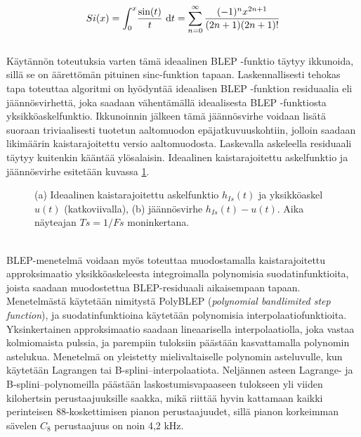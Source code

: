 \documentclass[finnish,12pt,a4paper,pdftex]{article} %
\begin{document}
\vspace{1mm}
\begin{equation}
Si(x) =  \int_{0}^x \! \frac{\text{sin}(t)}{t} \ \mathrm{d}t = \sum_{n=0}^{\infty} \\ 
\frac{(-1)^n x^{2n+1}}{(2n+1)(2n+1)!}
\end{equation} \\
\clearpage \noindent
Käytännön toteutuksia varten tämä ideaalinen BLEP -funktio täytyy ikkunoida, sillä se on äärettömän pituinen sinc-funktion tapaan. Laskennallisesti tehokas tapa toteuttaa algoritmi on hyödyntää ideaalisen BLEP -funktion residuaalia eli jäännösvirhettä, joka saadaan vähentämällä ideaalisesta BLEP -funktiosta yksikköaskelfunktio. Ikkunoinnin jälkeen tämä jäännösvirhe voidaan lisätä suoraan triviaalisesti tuotetun aaltomuodon epäjatkuvuuskohtiin, jolloin saadaan likimäärin kaistarajoitettu versio aaltomuodosta. Laskevalla askeleella residuaali täytyy kuitenkin kääntää ylösalaisin. Ideaalinen kaistarajoitettu askelfunktio ja jäännösvirhe esitetään kuvassa \ref{fig:iblep}. \cite{Valimaki2007, Pekonen2014, Valimaki2012} 
\begin{figure}[h] 
\begin{center} 
\caption{(a) Ideaalinen kaistarajoitettu askelfunktio $h_{Is}(t)$ ja yksikköaskel $u(t)$ (katkoviivalla), (b) jäännösvirhe $h_{Is}(t)-u(t)$. Aika näyteajan $Ts = 1/Fs$ moninkertana.}
\label{fig:iblep}
\end{center}
\end{figure} \\
BLEP-menetelmä voidaan myös toteuttaa muodostamalla kaistarajoitettu approksimaatio yksikköaskeleesta integroimalla polynomisia suodatinfunktioita, joista saadaan muodostettua BLEP-residuaali aikaisempaan tapaan. Menetelmästä käytetään nimitystä PolyBLEP (\textit{polynomial bandlimited step function}), ja suodatinfunktioina käytetään polynomisia interpolaatiofunktioita. Yksinkertainen approksimaatio saadaan lineaarisella interpolaatiolla, joka vastaa kolmiomaista pulssia, ja parempiin tuloksiin päästään kasvattamalla polynomin astelukua. Menetelmä on yleistetty mielivaltaiselle polynomin asteluvulle, kun käytetään Lagrangen tai B-splini--interpolaatiota. Neljännen asteen Lagrange- ja B-splini--polynomeilla päästään laskostumisvapaaseen tulokseen yli viiden kilohertsin perustaajuuksille saakka, mikä riittää hyvin kattamaan kaikki perinteisen 88-koskettimisen pianon perustaajuudet, sillä pianon korkeimman sävelen $C_8$ perustaajuus on noin 4,2 kHz. \cite{Valimaki2007, Pekonen2014, Sound, Valimaki2012} 
\end{document}
